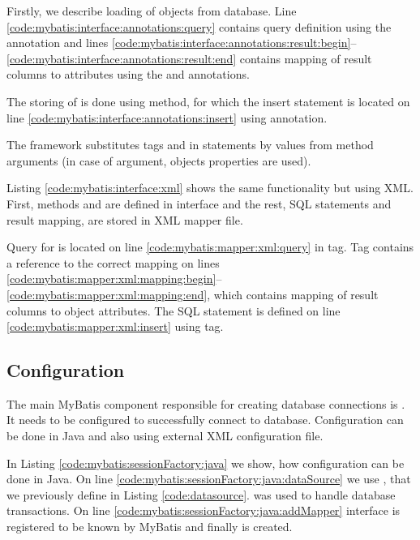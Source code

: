 Firstly, we describe loading of  objects from database.
Line \ref{code:mybatis:interface:annotations:query}
contains query definition using the  annotation and lines
\ref{code:mybatis:interface:annotations:result:begin}--\ref{code:mybatis:interface:annotations:result:end}
contains mapping of result columns to  attributes
using the  and  annotations.

The storing of  is done using  method,
for which the insert statement is located on line \ref{code:mybatis:interface:annotations:insert}
using  annotation.

The framework substitutes tags  and 
in statements by values from method arguments (in case of  argument,
objects properties are used).



Listing \ref{code:mybatis:interface:xml} shows the same functionality but using XML.
First, methods  and  are defined in  interface and the rest,
SQL statements and result mapping, are stored in XML mapper file.

Query for  is located on line \ref{code:mybatis:mapper:xml:query} in  tag.
Tag contains a reference to the correct  mapping on lines
\ref{code:mybatis:mapper:xml:mapping:begin}--\ref{code:mybatis:mapper:xml:mapping:end},
which contains mapping of result columns to  object attributes.
The  SQL statement is defined on line \ref{code:mybatis:mapper:xml:insert}
using  tag.




\subsection{Configuration \label{frameworks:myBatis:configuration}}

The main MyBatis component responsible for creating database connections
is . It needs to be configured to successfully connect
to database. Configuration can be done in Java and also using external XML configuration file.

In Listing \ref{code:mybatis:sessionFactory:java} we show, how configuration can be
done in Java. On line \ref{code:mybatis:sessionFactory:java:dataSource} we use ,
that we previously define in Listing \ref{code:datasource}.
 was used to handle database transactions.
On line \ref{code:mybatis:sessionFactory:java:addMapper}  interface is registered
to be known by MyBatis and finally  is created.

